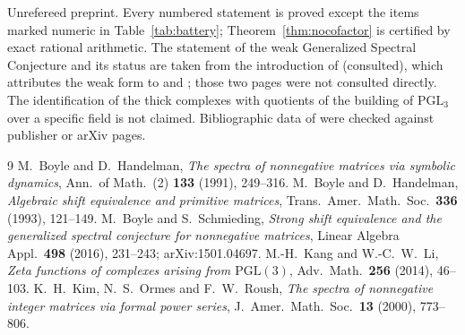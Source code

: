 \documentclass[11pt]{amsart}
\numberwithin{equation}{section}
\theoremstyle{definition}
\theoremstyle{remark}
\newcommand{\PGL}{\mathrm{PGL}}
\begin{document}
Unrefereed preprint. Every numbered statement is proved except the items marked numeric in
Table~\ref{tab:battery}; Theorem~\ref{thm:nocofactor} is certified by exact rational
arithmetic. The statement of the weak Generalized Spectral Conjecture and its status are
taken from the introduction of \cite{BS} (consulted), which attributes the weak form to
\cite[p.~253]{BH91} and \cite[p.~124]{BH93}; those two pages were not consulted directly.
The identification of the thick complexes with quotients of the building of $\PGL_3$ over a
specific field is not claimed. Bibliographic data of \cite{BH91,BH93,BS,KOR,KL} were checked
against publisher or arXiv pages.

\begin{thebibliography}{9}
 M.~Boyle and D.~Handelman, \emph{The spectra of nonnegative matrices via
symbolic dynamics}, Ann.\ of Math.\ (2) \textbf{133} (1991), 249--316.
 M.~Boyle and D.~Handelman, \emph{Algebraic shift equivalence and primitive
matrices}, Trans.\ Amer.\ Math.\ Soc.\ \textbf{336} (1993), 121--149.
 M.~Boyle and S.~Schmieding, \emph{Strong shift equivalence and the generalized
spectral conjecture for nonnegative matrices}, Linear Algebra Appl.\ \textbf{498} (2016),
231--243; arXiv:1501.04697.
 M.-H.~Kang and W.-C.~W.~Li, \emph{Zeta functions of complexes arising from
$\mathrm{PGL}(3)$}, Adv.\ Math.\ \textbf{256} (2014), 46--103.
 K.~H.~Kim, N.~S.~Ormes and F.~W.~Roush, \emph{The spectra of nonnegative
integer matrices via formal power series}, J.\ Amer.\ Math.\ Soc.\ \textbf{13} (2000),
773--806.
\end{thebibliography}
\end{document}
